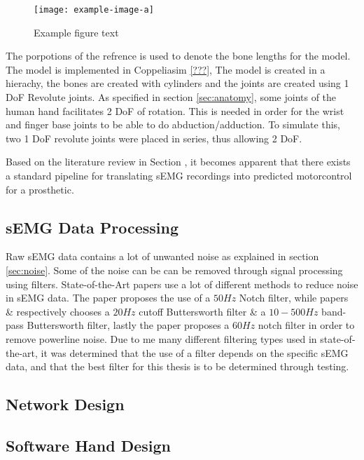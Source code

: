\documentclass[../main.tex]{subfiles}
\begin{document}
\begin{figure}[h]
\begin{center}
\texttt{[image: example-image-a]}
\caption{Example figure text}
\label{fig:handref}
\end{center}
\end{figure}

The porpotions of the refrence is used to denote the bone lengths for the model.
The model is implemented in Coppeliasim \ref{???}, The model is created in a hierachy, the bones are created with cylinders and the joints are created using 1 DoF Revolute joints.
As specified in section \ref{sec:anatomy}, some joints of the human hand facilitates 2 DoF of rotation.
This is needed in order for the wrist and finger base joints to be able to do \gls{abduction/adduction}.
To simulate this, two 1 DoF revolute joints were placed in series, thus allowing 2 DoF.



Based on the literature review in Section \label{sec:literature}, it becomes apparent that there exists a standard pipeline for translating sEMG recordings into predicted motorcontrol for a prosthetic.

\subsection{sEMG Data Processing}

Raw sEMG data contains a lot of unwanted noise as explained in section \ref{sec:noise}.
Some of the noise can be can be removed through signal processing using filters.
State-of-the-Art papers use a lot of different methods to reduce noise in sEMG data.
The paper \cite{multdof} proposes the use of a $50Hz$ Notch filter, while papers \cite{graspintent} \& \cite{ashirbad2022} respectively chooses a $20Hz$ cutoff Buttersworth filter \& a $10-500Hz$ band-pass Buttersworth filter, lastly the paper proposes a $60Hz$ notch filter in order to remove powerline noise.
Due to me many different filtering types used in state-of-the-art, it was determined that the use of a filter depends on the specific sEMG data, and that the best filter for this thesis is to be determined through testing.

\subsection{Network Design}
\subsection{Software Hand Design}
\end{document}
